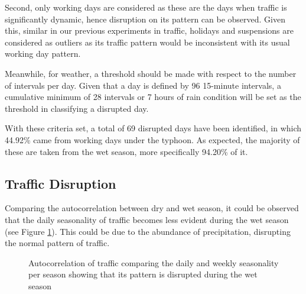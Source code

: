 Second, only working days are considered as these are the days when traffic is significantly dynamic, hence disruption on its pattern can be observed. Given this, similar in our previous experiments in traffic, holidays and suspensions are considered as outliers as its traffic pattern would be inconsistent with its usual working day pattern.

Meanwhile, for weather, a threshold should be made with respect to the number of intervals per day. Given that a day is defined by 96 15-minute intervals, a cumulative minimum of 28 intervals or 7 hours of rain condition will be set as the threshold in classifying a disrupted day.

With these criteria set, a total of 69 disrupted days have been identified, in which 44.92\% came from working days under the typhoon. As expected, the majority of these are taken from the wet season, more specifically 94.20\% of it.

\subsection{Traffic Disruption}
Comparing the autocorrelation between dry and wet season, it could be observed that the daily seasonality of traffic becomes less evident during the wet season (see Figure \ref{figure_autocorr_traffic_season}). This could be due to the abundance of precipitation, disrupting the normal pattern of traffic.


\begin{figure}[h] 
\centering
    \centering
      \captionsetup{justification=centering}
    \hfill
    \caption{Autocorrelation of traffic comparing the daily and weekly seasonality per season showing that its pattern is disrupted during the wet season}
    \label{figure_autocorr_traffic_season}
\end{figure}

